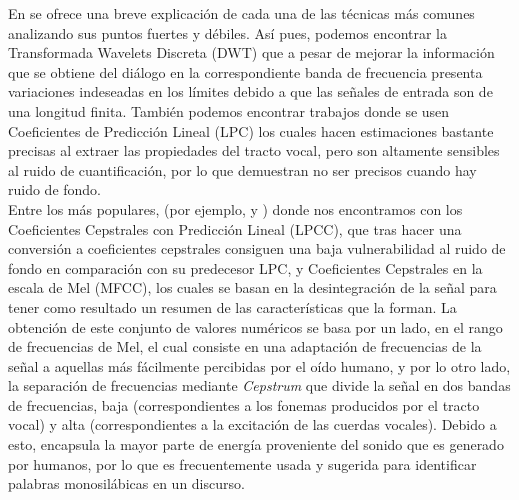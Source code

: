 \documentclass[11pt,a4paper,spanish]{book}
\begin{document}

	
	En \cite{Rashid2018} se ofrece una breve explicación de cada una de las técnicas más comunes analizando sus puntos fuertes y débiles. Así pues, podemos encontrar la Transformada Wavelets Discreta (DWT) que a pesar de mejorar la información que se obtiene del diálogo en la correspondiente banda de frecuencia presenta variaciones indeseadas en los límites debido a que las señales de entrada son de una longitud finita. También podemos encontrar trabajos donde se usen Coeficientes de Predicción Lineal (LPC) los cuales hacen estimaciones bastante precisas al extraer las propiedades del tracto vocal, pero son altamente sensibles al ruido de cuantificación, por lo que demuestran no ser precisos cuando hay ruido de fondo. \\
	Entre los más populares, (por ejemplo, \cite{Hajarolasvadi2019} y \cite{AbdulQayyum2019}) donde nos encontramos con los Coeficientes Cepstrales con Predicción Lineal (LPCC), que tras hacer una conversión a coeficientes cepstrales consiguen una baja vulnerabilidad al ruido de fondo en comparación con su predecesor LPC, y Coeficientes Cepstrales en la escala de Mel (MFCC), los cuales se basan en la desintegración de la señal para tener como resultado un resumen de las características que la forman. La obtención de este conjunto de valores numéricos se basa por un lado, en el rango de frecuencias de Mel, el cual consiste en una adaptación de frecuencias de la señal a aquellas más fácilmente percibidas por el oído humano, y por lo otro lado, la separación de frecuencias mediante \emph{Cepstrum} que divide la señal en dos bandas de frecuencias, baja (correspondientes a los fonemas producidos por el tracto vocal) y alta (correspondientes a la excitación de las cuerdas vocales). Debido a esto, encapsula la mayor parte de energía proveniente del sonido que es generado por humanos, por lo que es frecuentemente usada y sugerida para identificar palabras monosilábicas en un discurso\cite{Hajarolasvadi2019}.
	
\end{document}
